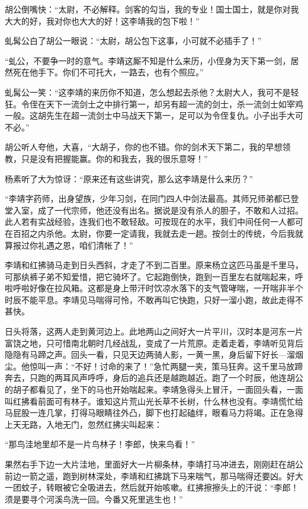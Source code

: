 胡公倒嘴快：“太尉，不必解释。剑客的勾当，我的专业！国士国士，就是你对我大大的好，我对你也大大的好！这李靖我的包下啦！”

虬髯公白了胡公一眼说：“太尉，胡公包下这事，小可就不必插手了！”

“虬公，不要争一时的意气。李靖这厮不知是什么来历，小侄身为天下第一剑，居然死在他手下。你们不可托大，一路去，也有个照应。”

虬髯公一笑：“这李靖的来历你不知道，怎么想起去杀他？太尉大人，我可不是轻狂。令侄在天下一流剑士之中排行第一，却另有超一流的剑士，杀一流剑士如宰鸡一般。这胡先生在超一流剑士中马战天下第一，足可以为令侄复仇。小子出手大可不必。”

胡公听人夸他，大喜，“大胡子，你的也不错。你的剑术天下第二，我的早想领教，只是没有把握能赢。你的和我去，我的很乐意呀！”

杨素听了大为惊讶：“原来还有这些讲究，那么这李靖是什么来历？”

“李靖字药师，出身望族，少年习剑，在同门四人中剑法最高。其师兄师弟都已登堂入室，成了一代宗师，他还没有出名。据说是没有杀人的胆子，不敢和人过招。此人若有实战经验，连我们也不敢轻敌。可按现在的水平，我们中间任何一人都可在百招之内杀他。太尉，你要一定请我，我就去走一趟。按剑士的传统，今后我就算报过你礼遇之恩，咱们清帐了！”

李靖和红拂骑马走到日头西斜，才走了不到二百里。原来杨立这匹马虽是千里马，可那纨裤子弟不知爱惜，把它骑坏了。它起跑倒快，跑到一百里左右就喘起来，呼啦呼啦好像在拉风箱。这都是身上带汗时饮凉水落下的支气管哮喘，一开喘非半个时辰不能平息。李靖见马喘得可怜，不敢再叫它快跑，只好一溜小跑，故此走得不甚快。

日头将落，这两人走到黄河边上。此地两山之间好大一片平川，汉时本是河东一片富饶之地，只可惜南北朝时几经战乱，变成了一片荒原。走着走着，李靖听见背后隐隐有马蹄之声。回头一看，只见天边两骑人影，一黄一黑，身后留下好长—溜烟尘。他惊叫一声：“不好！讨命的来了！”急忙两腿一夹，策马狂奔。这千里马放蹄奔去，只跑的两耳风声呼呼，身后的追兵还是越跑越近。跑了一个时辰，他连胡公的胡子都看见了，坐下的马也开始喘起来。李靖急得头上冒汗，一面回头看，一面叫红拂看前面可有林子。谁知这片荒山光长草不长树，什么林也没有。李靖慌忙给马屁股一连几掌，打得马眼睛往外凸，脚下也打起磕绊，眼看马力将竭。正在急得上天无路，入地无门，忽然红拂尖叫起来：

“那鸟洼地里却不是一片鸟林子！李郎，快来鸟看！”

果然右手下边一大片洼地，里面好大一片柳条林，李靖打马冲进去，刚刚赶在胡公前边一箭之遥，跑到树林深处，李靖和红拂跳下马来喘气，那马喘得还要凶。好大一团蚊子，转眼被它全吸进去，然后就开始咳嗽。红拂擦擦头上的汗说：“李郎！须是要寻个河溪鸟洗一回。今番又死里逃生也！”

